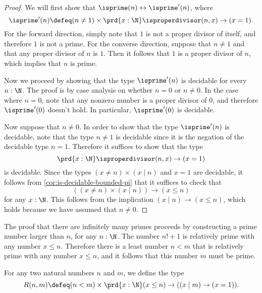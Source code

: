 \begin{proof}
  We will first show that $\isprime(n)\leftrightarrow\isprime'(n)$, where
  \begin{equation*}
    \isprime'(n)\defeq (n\neq 1)\times \prd{x:\N}\isproperdivisor(n,x)\to (x=1).
  \end{equation*}
  For the forward direction, simply note that $1$ is not a proper divisor of itself, and therefore $1$ is not a prime. For the converse direction, suppose that $n\neq 1$ and that any proper divisor of $n$ is $1$. Then it follows that $1$ is a proper divisor of $n$, which implies that $n$ is prime.

  Now we proceed by showing that the type $\isprime'(n)$ is decidable for every $n:\N$. The proof is by case analysis on whether $n=0$ or $n\neq 0$. In the case where $n=0$, note that any nonzero number is a proper divisor of $0$, and therefore $\isprime'(0)$ doesn't hold. In particular, $\isprime'(0)$ is decidable.
  
  Now suppose that $n\neq 0$. In order to show that the type $\isprime'(n)$ is decidable, note that the type $n\neq 1$ is decidable since it is the negation of the decidable type $n=1$. Therefore it suffices to show that the type
  \begin{equation*}
    \prd{x:\N}\isproperdivisor(n,x)\to (x=1)
  \end{equation*}
  is decidable. Since the types $(x\neq n)\times (x\mid n)$ and $x=1$ are decidable, it follows from \cref{cor:is-decidable-bounded-pi} that it suffices to check that
  \begin{equation*}
    ((x\neq n)\times (x\mid n))\to (x\leq n)
  \end{equation*}
  for any $x:\N$. This follows from the implication $(x\mid n)\to (x\leq n)$, which holds because we have assumed that $n\neq 0$.
\end{proof}

The proof that there are infinitely many primes proceeds by constructing a prime number larger than $n$, for any $n:\N$. The number $n!+1$ is relatively prime with any number $x\leq n$. Therefore there is a least number $n<m$ that is relatively prime with any number $x\leq n$, and it follows that this number $m$ must be prime.

\begin{defn}
  For any two natural numbers $n$ and $m$, we define the type
  \begin{equation*}
    R(n,m)\defeq (n<m)\times \prd{x:\N}(x\leq n)\to ((x\mid m)\to (x=1)). 
  \end{equation*}
\end{defn}


